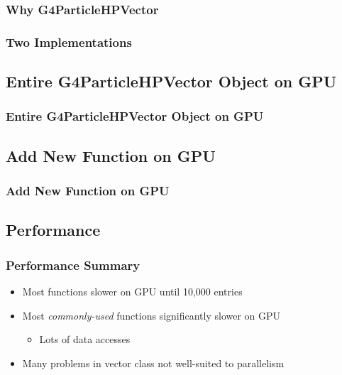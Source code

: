 \documentclass{beamer}
\newcommand{\textapprox}{\raisebox{0.5ex}{\texttildelow}}
\begin{document}
\begin{frame}
\frametitle{Why G4ParticleHPVector}
\end{frame}

\begin{frame}
\frametitle{Two Implementations}
\end{frame}

\subsection{Entire G4ParticleHPVector Object on GPU}
\begin{frame}
\frametitle{Entire G4ParticleHPVector Object on GPU}
\end{frame}

\subsection{Add New Function on GPU}
\begin{frame}
\frametitle{Add New Function on GPU}
\end{frame}

\subsection{Performance}
\begin{frame}
\frametitle{Performance Summary}
\begin{itemize}
\item Most functions slower on GPU until \textapprox 10,000 entries 
\item Most \emph{commonly-used} functions significantly slower on GPU
\begin{itemize}
\item Lots of data accesses
\end{itemize}
\item Many problems in vector class not well-suited to parallelism
\end{itemize}
\end{frame}
\end{document}
